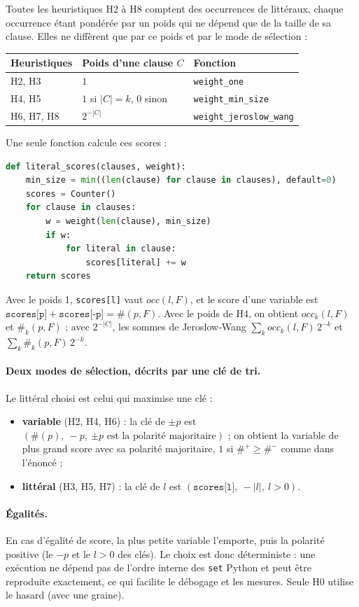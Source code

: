 \documentclass[11pt,a4paper]{article}
\begin{document}
Toutes les heuristiques H2 à H8 comptent des occurrences de littéraux, chaque
occurrence étant pondérée par un poids qui ne dépend que de la taille de sa
clause. Elles ne diffèrent que par ce poids et par le mode de sélection :
\begin{center}
\begin{tabular}{lll}
  \toprule
  Heuristiques & Poids d'une clause $C$ & Fonction \\
  \midrule
  H2, H3 & $1$ & \texttt{weight\_one} \\
  H4, H5 & $1$ si $|C| = k$, $0$ sinon & \texttt{weight\_min\_size} \\
  H6, H7, H8 & $2^{-|C|}$ & \texttt{weight\_jeroslow\_wang} \\
  \bottomrule
\end{tabular}
\end{center}
Une seule fonction calcule ces scores :
\begin{lstlisting}[language=Python]
def literal_scores(clauses, weight):
    min_size = min((len(clause) for clause in clauses), default=0)
    scores = Counter()
    for clause in clauses:
        w = weight(len(clause), min_size)
        if w:
            for literal in clause:
                scores[literal] += w
    return scores
\end{lstlisting}
Avec le poids 1, \texttt{scores[l]} vaut $occ(l, F)$, et le score d'une
variable est $\texttt{scores[p]} + \texttt{scores[-p]} = \#(p, F)$. Avec le
poids de H4, on obtient $occ_k(l, F)$ et $\#_k(p, F)$ ; avec $2^{-|C|}$, les
sommes de Jeroslow-Wang $\sum_k occ_k(l, F)\,2^{-k}$ et
$\sum_k \#_k(p, F)\,2^{-k}$.

\paragraph{Deux modes de sélection, décrits par une clé de tri.} Le littéral
choisi est celui qui maximise une clé :
\begin{itemize}
  \item \textbf{variable} (H2, H4, H6) : la clé de $\pm p$ est
    $(\#(p),\ -p,\ \text{$\pm p$ est la polarité majoritaire})$ ; on obtient
    la variable de plus grand score avec sa polarité majoritaire, $1$ si
    $\#^+ \geq \#^-$ comme dans l'énoncé ;
  \item \textbf{littéral} (H3, H5, H7) : la clé de $l$ est
    $(\texttt{scores[l]},\ -|l|,\ l > 0)$.
\end{itemize}
\paragraph{Égalités.} En cas d'égalité de score, la plus petite variable
l'emporte, puis la polarité positive (le $-p$ et le $l>0$ des clés). Le choix
est donc déterministe : une exécution ne dépend pas de l'ordre interne des
\texttt{set} Python et peut être reproduite exactement, ce qui facilite le
débogage et les mesures. Seule H0 utilise le hasard (avec une graine).
\end{document}
